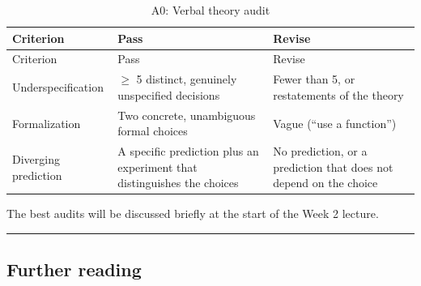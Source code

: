 \begin{longtable}[]{@{}
  >{\raggedright\arraybackslash}p{}
  >{\raggedright\arraybackslash}p{}
  >{\raggedright\arraybackslash}p{}@{}}
\caption{\centering A0: Verbal theory audit}\tabularnewline
\toprule\noalign{}
\begin{minipage}[b]{\linewidth}\raggedright
Criterion
\end{minipage} & \begin{minipage}[b]{\linewidth}\raggedright
Pass
\end{minipage} & \begin{minipage}[b]{\linewidth}\raggedright
Revise
\end{minipage} \\
\midrule\noalign{}
\endfirsthead
\toprule\noalign{}
\begin{minipage}[b]{\linewidth}\raggedright
Criterion
\end{minipage} & \begin{minipage}[b]{\linewidth}\raggedright
Pass
\end{minipage} & \begin{minipage}[b]{\linewidth}\raggedright
Revise
\end{minipage} \\
\midrule\noalign{}
\endhead
\bottomrule\noalign{}
\endlastfoot
Underspecification & \ensuremath{\geq} 5 distinct, genuinely unspecified decisions &
Fewer than 5, or restatements of the theory \\
Formalization & Two concrete, unambiguous formal choices & Vague (``use
a function'') \\
Diverging prediction & A specific prediction plus an experiment that
distinguishes the choices & No prediction, or a prediction that does not
depend on the choice \\
\end{longtable}

The best audits will be discussed briefly at the start of the Week 2
lecture.

\begin{center}\rule{0.5\linewidth}{0.5pt}\end{center}

\subsection{Further reading}

